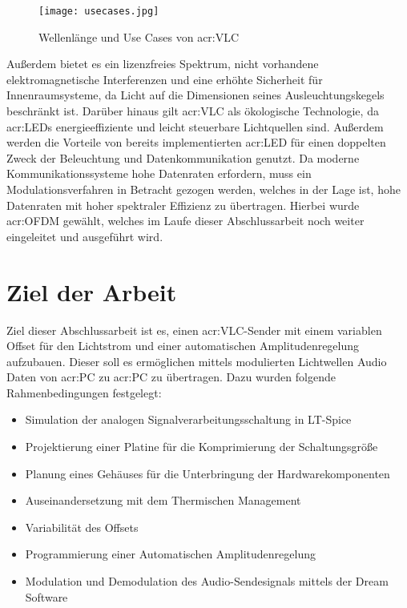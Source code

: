 \begin{figure}[H]
	\centering
	\texttt{[image: usecases.jpg]}
	\caption[Wellenlänge und Use Cases von \gls{acr:VLC}]{Wellenlänge und Use Cases von \gls{acr:VLC}} 
	\cite{usecase}
	\label{fig:usecasevlc}
\end{figure}

Außerdem bietet es ein lizenzfreies Spektrum, nicht vorhandene elektromagnetische Interferenzen und eine erhöhte Sicherheit für Innenraumsysteme, da Licht auf die Dimensionen seines Ausleuchtungskegels beschränkt ist. Darüber hinaus gilt \gls{acr:VLC} als ökologische Technologie, da \gls{acr:LED}s energieeffiziente und leicht steuerbare Lichtquellen sind. Außerdem werden die Vorteile von bereits implementierten \gls{acr:LED} für einen doppelten Zweck der Beleuchtung und Datenkommunikation genutzt. Da moderne Kommunikationssysteme hohe Datenraten erfordern, muss ein Modulationsverfahren in Betracht gezogen werden, welches in der Lage ist, hohe Datenraten mit hoher spektraler Effizienz zu übertragen.\cite{VLC} Hierbei wurde \gls{acr:OFDM} gewählt, welches im Laufe dieser Abschlussarbeit noch weiter eingeleitet und ausgeführt wird.


\section{Ziel der Arbeit}
\label{sec:The aim of the work}


Ziel dieser Abschlussarbeit ist es, einen \gls{acr:VLC}-Sender mit einem variablen Offset für den Lichtstrom und einer automatischen Amplitudenregelung aufzubauen. Dieser soll es ermöglichen mittels modulierten Lichtwellen Audio Daten von \gls{acr:PC} zu \gls{acr:PC} zu übertragen. Dazu wurden folgende Rahmenbedingungen festgelegt: 

\begin{itemize}
	\item Simulation der analogen Signalverarbeitungsschaltung in LT-Spice
	\item Projektierung einer Platine für die Komprimierung der Schaltungsgröße
	\item Planung eines Gehäuses für die Unterbringung der Hardwarekomponenten
	\item Auseinandersetzung mit dem Thermischen Management
	\item Variabilität des Offsets
	\item Programmierung einer Automatischen Amplitudenregelung
	\item Modulation und Demodulation des Audio-Sendesignals mittels der Dream Software
\end{itemize}





